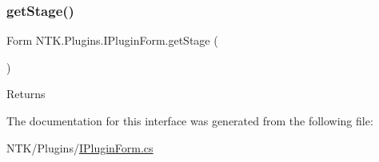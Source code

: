 \subsubsection{\texorpdfstring{getStage()}{getStage()}}
{\footnotesize\ttfamily Form N\+T\+K.\+Plugins.\+I\+Plugin\+Form.\+get\+Stage (\begin{DoxyParamCaption}{ }\end{DoxyParamCaption})}





\begin{DoxyReturn}{Returns}

\end{DoxyReturn}


The documentation for this interface was generated from the following file\+:\begin{DoxyCompactItemize}
\item 
N\+T\+K/\+Plugins/\mbox{\hyperlink{_i_plugin_form_8cs}{I\+Plugin\+Form.\+cs}}\end{DoxyCompactItemize}
